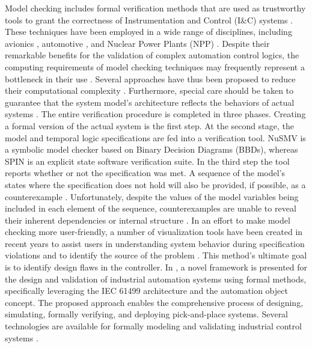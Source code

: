 \begin{bibunit}
Model checking includes formal verification methods that are used as trustworthy tools to grant the correctness of Instrumentation and Control (I\&C) systems \cite{clarke1999, schneider2004, baier2008}.
These techniques have been employed in a wide range of disciplines, including avionics \cite{gelman2013, wang2019}, automotive \cite{todorov2018, kim2015, Filipovikj2016}, and Nuclear Power Plants (NPP) \cite{pakonen2021, Jee2010, nemeth2009, adiego2015}.
Despite their remarkable benefits for the validation of complex automation control logics, the computing requirements of model checking techniques may frequently represent a bottleneck in their use \cite{Buzhinsky2020}. Several approaches have thus been proposed to reduce their computational complexity \cite{Cimatti2012, Biere2003, burch1992}.
Furthermore, special care should be taken to guarantee that the system model's architecture reflects the behaviors of actual systems \cite{Cordeiro2020}. 
The entire verification procedure is completed in three phases. Creating a formal version of the actual system is the first step. At the second stage, the model and temporal logic specifications are fed into a verification tool.
NuSMV \cite{Cimatti2002} is a symbolic model checker based on  Binary Decision Diagrams (BBDs), whereas SPIN \cite{Holzmann1997} is an explicit state software verification suite.
In the third step the tool reports whether or not the specification was met. A sequence of the model's states where the specification does not hold will also be provided, if possible, as a counterexample \cite{beer2012}.
Unfortunately, despite the values of the model variables being included in each element of the sequence, counterexamples are unable to reveal their inherent dependencies or internal structure \cite{Ovsiannikova2021}.
In an effort to make model checking more user-friendly, a number of visualization tools \cite{pakonen2018} have been created in recent years to assist users in understanding system behavior during specification violations and to identify the source of the problem \cite{Loer2006, bochot2010, Patil2015}. This method's ultimate goal is to identify design flaws in the controller. 
In \cite{vyatkin2011iec}, a novel framework is presented for the design and validation of industrial automation systems using formal methods, specifically leveraging the IEC 61499 architecture and the automation object concept. The proposed approach enables the comprehensive process of designing, simulating, formally verifying, and deploying pick-and-place systems. 
Several technologies are available for formally modeling and validating industrial control systems \cite{vyatkin2001formal}.

\end{bibunit}
